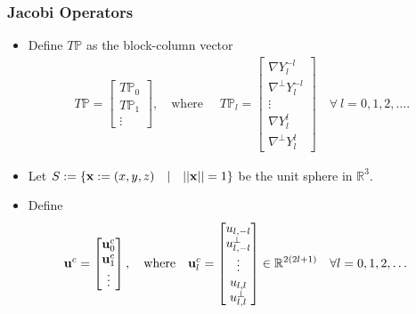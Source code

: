 \documentclass[10pt]{beamer}
\newcommand{\R}{\mathbb{R}}
\newcommand{\gradP}{T\mathbb{P}}
\newcommand{\gradY}{\nabla Y}
\newcommand{\gradpY}{\nabla^\perp Y}
\begin{document}
\frame
{
    \frametitle{Jacobi Operators}

\begin{itemize}

\item Define \(\gradP\) as the block-column vector
\begin{align}
\gradP = \begin{bmatrix} \gradP_0 \\ \gradP_1 \\ \vdots \end{bmatrix}, \quad \text{where } \quad \gradP_l = \begin{bmatrix} \gradY^{-l}_l \\ \gradpY^{-l}_l \\ \vdots \\ \gradY^{l}_l \\ \gradpY^{l}_l  \end{bmatrix} \quad \forall \: l = 0, 1, 2, \dots.
\end{align}

\item Let $S := \{ \bold{x} := (x,y,z) \quad | \quad ||\bold{x}|| = 1\}$ be the unit sphere in $\R^3$.

\item Define
\begin{align}
\bold{u}^c = \begin{bmatrix}
			\bold{u}_0^c \\
			\bold{u}_1^c \\
			\vdots \\
		    \end{bmatrix},		  
\quad
\text{where}
\quad
\bold{u}^c_l &= \begin{bmatrix}
				u_{l,-l} \\
				u^{\perp}_{l,-l} \\
				\vdots \\
				u_{l,l} \\
				u^{\perp}_{l,l}
		        \end{bmatrix} \in \R^{2(2l+1)} \quad \forall l = 0,1,2,\dots
\end{align}

\end{itemize}

}
\end{document}
